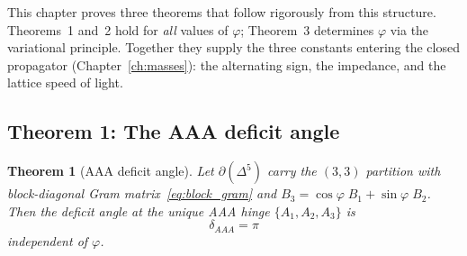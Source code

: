 \documentclass[12pt]{article}
\newtheorem{theorem}{Theorem}[section]
\theoremstyle{remark}
\theoremstyle{definition}
\begin{document}
This chapter proves three theorems that follow rigorously from this
structure.  Theorems~1 and~2 hold for \emph{all} values of $\varphi$;
Theorem~3 determines $\varphi$ via the variational principle.
Together they supply the three constants entering the closed propagator
(Chapter~\ref{ch:masses}): the alternating sign, the impedance, and
the lattice speed of light.

\subsection{Theorem 1: The AAA deficit angle}
\label{sec:thm_AAA}

\begin{theorem}[AAA deficit angle]\label{thm:delta_AAA}
Let $\partial(\Delta^5)$ carry the $(3,3)$ partition with
block-diagonal Gram matrix~\eqref{eq:block_gram} and
$B_3 = \cos\varphi\; B_1 + \sin\varphi\; B_2$.  Then the deficit
angle at the unique AAA hinge $\{A_1, A_2, A_3\}$ is
\begin{equation}
\boxed{\delta_{AAA} = \pi}
\end{equation}
independent of $\varphi$.
\end{theorem}
\end{document}
